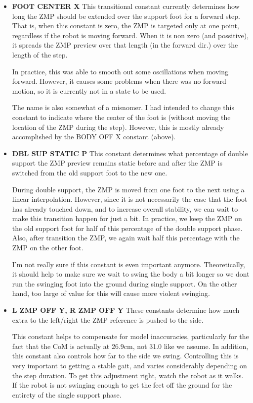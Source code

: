 \documentclass[11pt]{article}
\begin{document}
\begin{itemize}
\item {\bf FOOT CENTER X}  This transitional constant currently determines
how long the ZMP should be extended over the support foot for a forward
step.  That is, when this constant is zero, the ZMP is targeted only at one
point, regardless if the robot is moving forward. When it is non zero (and
possitive), it spreads the ZMP preview over that length (in the forward dir.)
over the length of the step.

In practice, this was able to smooth out some oscillations when moving forward.
However, it causes some problems when there was no forward motion, so it
is currently not in a state to be used.

The name is also somewhat of a misnomer. I had intended to change this
constant to indicate where the center of the foot is (without moving the
location of the ZMP during the step). However, this is mostly already
accomplished by the BODY OFF X constant (above).

\item {\bf DBL SUP STATIC P}  This constant determines what percentage of
double support the ZMP preview remains static before and after the ZMP is
switched from the old support foot to the new one.

During double support, the ZMP is moved from one foot to the next using a
linear interpolation.  However, since it is not necessarily the case that
the foot has already touched down, and to increase overall stability, we can
wait to make this transition happen for just a bit.  In practice, we keep the
ZMP on the old support foot for half of this percentage of the double support
phase. Also, after transition the ZMP, we again wait half this percentage
with the ZMP on the other foot.

I'm not really sure if this constant is even important anymore. Theoretically,
it should help to make sure we wait to swing the body a bit longer so we dont
run the swinging foot into the ground during single support. On the other hand,
too large of value for this will cause more violent swinging.

\item {\bf L ZMP OFF Y, R ZMP OFF Y}  These constants determine how much extra
 to the left/right the ZMP reference is pushed to the side.

This constant helps to compensate for model inaccuracies, particularly for
the fact that the CoM is actually at 26.9cm, not 31.0 like we assume. In
addition, this constant also controls how far to the side we swing.
Controlling this is very important to getting a stable gait, and varies
considerably depending on the step duration. To get this adjustment right,
watch the robot as it walks. If the robot is not swinging enough to get the
feet off the ground for the entirety of the single support phase.
 

\end{itemize}
\end{document}
